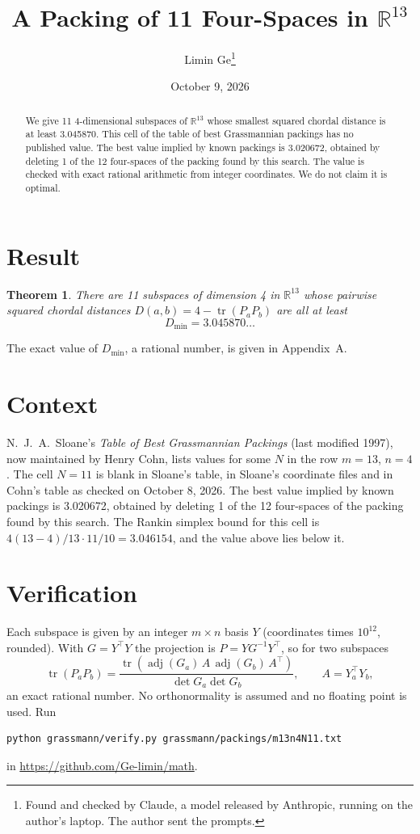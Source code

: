 \documentclass[11pt,a4paper]{article}
\title{A Packing of 11 Four-Spaces in $\mathbb{R}^{13}$}
\author{Limin Ge\thanks{Found and checked by Claude, a model released by Anthropic, running on the author's laptop. The author sent the prompts.}}
\date{October 9, 2026}
\newtheorem*{theorem}{Theorem}
\begin{document}
\maketitle
\begin{abstract}
We give 11 4-dimensional subspaces of $\mathbb{R}^{13}$ whose smallest squared chordal distance is at least 3.045870. This cell of the table of best Grassmannian packings has no published value. The best value implied by known packings is 3.020672, obtained by deleting 1 of the 12 four-spaces of the packing found by this search. The value is checked with exact rational arithmetic from integer coordinates. We do not claim it is optimal.
\end{abstract}

\section{Result}
\begin{theorem}
There are 11 subspaces of dimension 4 in $\mathbb{R}^{13}$ whose pairwise squared chordal distances $D(a,b) = 4 - \operatorname{tr}(P_aP_b)$ are all at least
\[ D_{\min} = 3.045870\ldots \]
\end{theorem}
The exact value of $D_{\min}$, a rational number, is given in Appendix~A.


\section{Context}
N.~J.~A.~Sloane's \emph{Table of Best Grassmannian Packings} (last modified 1997), now maintained by Henry Cohn, lists values for some $N$ in the row $m=13$, $n=4$. The cell $N=11$ is blank in Sloane's table, in Sloane's coordinate files and in Cohn's table as checked on October 8, 2026. The best value implied by known packings is 3.020672, obtained by deleting 1 of the 12 four-spaces of the packing found by this search. The Rankin simplex bound for this cell is $4(13-4)/13\cdot 11/10 = 3.046154$, and the value above lies below it.


\section{Verification}
Each subspace is given by an integer $m\times n$ basis $Y$ (coordinates times $10^{12}$, rounded). With $G=Y^\top Y$ the projection is $P=YG^{-1}Y^\top$, so for two subspaces
\[ \operatorname{tr}(P_aP_b)=\frac{\operatorname{tr}(\operatorname{adj}(G_a)\,A\,\operatorname{adj}(G_b)\,A^\top)}{\det G_a\det G_b},\qquad A=Y_a^\top Y_b, \]
an exact rational number. No orthonormality is assumed and no floating point is used. Run
\begin{verbatim}
python grassmann/verify.py grassmann/packings/m13n4N11.txt
\end{verbatim}
in \url{https://github.com/Ge-limin/math}.
\end{document}
